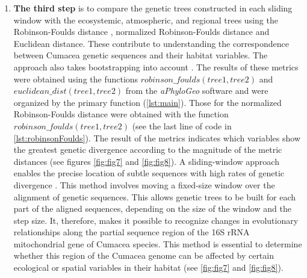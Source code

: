 \begin{enumerate}
\item \textbf{The third step} is to compare the genetic trees constructed in each sliding window with the ecosystemic, atmospheric, and regional trees using the Robinson-Foulds distance \citep{robinson_comparison_1981}, normalized Robinson-Foulds distance and Euclidean distance. These contribute to understanding the correspondence between Cumacea genetic sequences and their habitat variables. The approach also takes bootstrapping into account \citep{koshkarov_phylogeography_2022, li2023aphylogeo, li2024host}. The results of these metrics were obtained using the functions $robinson\_foulds(tree1, tree2)$ and $euclidean\_dist(tree1, tree2)$ from the \textit{aPhyloGeo} software and were organized by the primary function (\autoref{lst:main}). Those for the normalized Robinson-Foulds distance were obtained with the function $robinson\_foulds(tree1, tree2)$ (see the last line of code in \autoref{lst:robinsonFoulds}). The result of the metrics indicates which variables show the greatest genetic divergence according to the magnitude of the metric distances (see figures \ref{fig:fig7} and \ref{fig:fig8}). A sliding-window approach enables the precise location of subtle sequences with high rates of genetic divergence \citep{koshkarov_phylogeography_2022, li2023aphylogeo, li2024host}. This method involves moving a fixed-size window over the alignment of genetic sequences. This allows genetic trees to be built for each part of the aligned sequences, depending on the size of the window and the step size. It, therefore, makes it possible to recognize changes in evolutionary relationships along the partial sequence region of the 16S rRNA mitochondrial gene of Cumacea species. This method is essential to determine whether this region of the Cumacea genome can be affected by certain ecological or spatial variables in their habitat (see \autoref{fig:fig7} and \autoref{fig:fig8}).
\end{enumerate}


